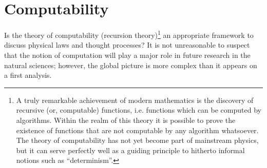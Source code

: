 \section{Computability}

Is  the theory of computability (recursion theory)\footnote{A truly
remarkable achievement of
modern mathematics is
the discovery of recursive
(or, computable) functions, i.e. functions which can be computed by
algorithms.
Within the realm of this
theory it is possible to prove the existence of functions that are not
computable
by any algorithm whatsoever.
The theory of computability  has not yet become part
of mainstream physics, but it can serve perfectly well  as a guiding
principle to hitherto informal notions such as ``determinism''.
}
 an appropriate framework to discuss physical laws and thought processes?
It is not unreasonable to suspect that the notion of
computation will play a major role in future research in the
natural sciences; however, the global picture is more complex than it
appears on a first analysis.

